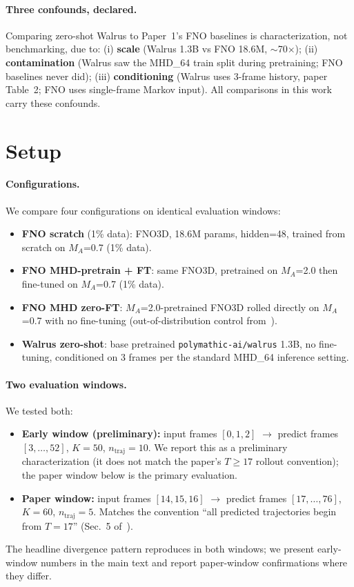 \documentclass{article}
\begin{document}
\paragraph{Three confounds, declared.} Comparing zero-shot Walrus to Paper~1's FNO baselines is characterization, not benchmarking, due to: (i) \textbf{scale} (Walrus 1.3B vs FNO 18.6M, $\sim$70$\times$); (ii) \textbf{contamination} (Walrus saw the MHD\_64 train split during pretraining; FNO baselines never did); (iii) \textbf{conditioning} (Walrus uses 3-frame history, paper Table~2; FNO uses single-frame Markov input). All comparisons in this work carry these confounds.

\section{Setup}

\paragraph{Configurations.} We compare four configurations on identical evaluation windows:

\begin{itemize}
  \setlength\itemsep{0.2em}
  \item \textbf{FNO scratch} (1\% data): FNO3D, 18.6M params, hidden=48, trained from scratch on $M_A$=0.7 (1\% data).
  \item \textbf{FNO MHD-pretrain + FT}: same FNO3D, pretrained on $M_A$=2.0 then fine-tuned on $M_A$=0.7 (1\% data).
  \item \textbf{FNO MHD zero-FT}: $M_A$=2.0-pretrained FNO3D rolled directly on $M_A$=0.7 with no fine-tuning (out-of-distribution control from~\cite{delaurentiis2026paper1}).
  \item \textbf{Walrus zero-shot}: base pretrained \texttt{polymathic-ai/walrus} 1.3B, no fine-tuning, conditioned on 3 frames per the standard MHD\_64 inference setting.
\end{itemize}

\paragraph{Two evaluation windows.} We tested both:
\begin{itemize}
  \setlength\itemsep{0.2em}
  \item \textbf{Early window (preliminary):} input frames $[0,1,2]$ $\to$ predict frames $[3,\ldots,52]$, $K{=}50$, $n_{\text{traj}}{=}10$. We report this as a preliminary characterization (it does not match the paper's $T{\geq}17$ rollout convention); the paper window below is the primary evaluation.
  \item \textbf{Paper window:} input frames $[14,15,16]$ $\to$ predict frames $[17,\ldots,76]$, $K{=}60$, $n_{\text{traj}}{=}5$. Matches the convention ``all predicted trajectories begin from $T{=}17$'' (Sec.~5 of~\cite{mccabe2025walrus}).
\end{itemize}
The headline divergence pattern reproduces in both windows; we present early-window numbers in the main text and report paper-window confirmations where they differ.
\end{document}
